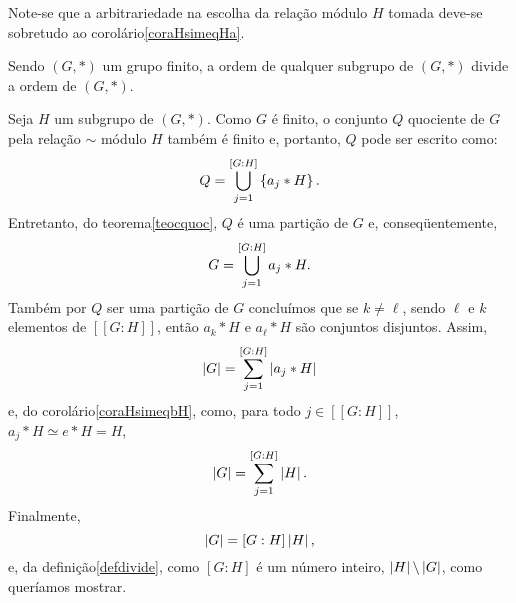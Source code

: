 \begin{Obs}
  Note-se que a arbitrariedade na escolha da relação módulo $H$ tomada
  deve-se
  sobretudo ao corolário\xspace\ref{coraHsimeqHa}.
\end{Obs}

\begin{Teo}\label{teolagrange}
  \mbox{}
  Sendo $(G,\ast)$ um grupo finito, a ordem de qualquer subgrupo de
  $(G,\ast)$ divide a ordem de $(G,\ast)$.
\end{Teo}

\begin{dem}
  Seja $H$ um subgrupo de $(G,\ast)$.
  Como $G$ é finito, o conjunto $Q$ quociente de $G$ pela relação $\sim$
  módulo $H$ também é finito e, portanto, $Q$ pode ser escrito como:
  \begin{equation*}
    Q = \bigcup_{j=1}^{[G:H]}\left\{ a_j\ast H \right\}\mathrm{.}
  \end{equation*}
  Entretanto, do teorema\xspace\ref{teocquoc}, $Q$ é uma partição de $G$
  e, conseqüentemente,
  \begin{equation*}
    G = \bigcup_{j=1}^{[G:H]} a_j\ast H\mathrm{.}
  \end{equation*}
  Também por $Q$ ser uma partição de $G$ concluímos que se $k\neq\ell $,
  sendo $\ell$ e $k$ elementos de $[[G:H]]$, então $a_k\ast H$ e 
  $a_{\ell}\ast H$ são conjuntos disjuntos. Assim,
  \begin{equation*}
    \left| G \right| = \sum_{j=1}^{[G:H]} \left| a_j\ast H \right|
  \end{equation*}
  e, do corolário\xspace\ref{coraHsimeqbH}, como, para todo $j\in[[G:H]]$,
  $a_j\ast H\simeq e\ast H = H$,
  \begin{equation*}
    \left| G \right| = \sum_{j=1}^{[G:H]} \left| H \right|\mathrm{.}
  \end{equation*}
  Finalmente,
  \begin{equation*}
    \left| G \right| = [G:H]\left| H \right|\mathrm{,}
  \end{equation*}
  e, da definição\xspace\ref{defdivide}, como $[G:H]$ é um número inteiro,
  $\left| H \right|\backslash \left| G \right|$, como queríamos mostrar.
\end{dem}


